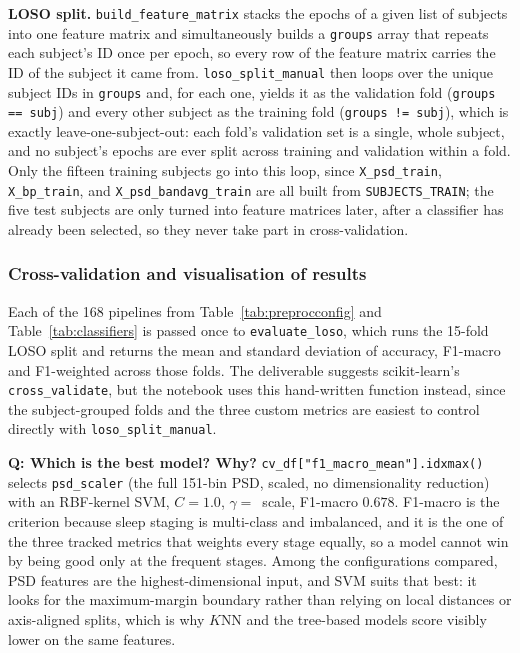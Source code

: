 \documentclass[11pt,a4paper]{article}
\newcommand{\num}[1]{#1}
\begin{document}
\textbf{LOSO split.} \texttt{build\_feature\_matrix} stacks the epochs of a given list of
subjects into one feature matrix and simultaneously builds a \texttt{groups} array that repeats
each subject's ID once per epoch, so every row of the feature matrix carries the ID of the
subject it came from. \texttt{loso\_split\_manual} then loops over the unique subject IDs in
\texttt{groups} and, for each one, yields it as the validation fold (\texttt{groups == subj})
and every other subject as the training fold (\texttt{groups != subj}), which is exactly
leave-one-subject-out: each fold's validation set is a single, whole subject, and no subject's
epochs are ever split across training and validation within a fold. Only the fifteen training
subjects go into this loop, since \texttt{X\_psd\_train}, \texttt{X\_bp\_train}, and
\texttt{X\_psd\_bandavg\_train} are all built from \texttt{SUBJECTS\_TRAIN}; the five test
subjects are only turned into feature matrices later, after a classifier has already been
selected, so they never take part in cross-validation.

\subsubsection{Cross-validation and visualisation of results}

Each of the \num{168} pipelines from Table~\ref{tab:preprocconfig} and Table~\ref{tab:classifiers}
is passed once to \texttt{evaluate\_loso}, which runs the 15-fold LOSO split and returns the mean
and standard deviation of accuracy, F1-macro and F1-weighted across those folds. The deliverable
suggests scikit-learn's \texttt{cross\_validate}, but the notebook uses this hand-written
function instead, since the subject-grouped folds and the three custom metrics are easiest to
control directly with \texttt{loso\_split\_manual}.

\textbf{Q: Which is the best model? Why?} \texttt{cv\_df["f1\_macro\_mean"].idxmax()} selects
\texttt{psd\_scaler} (the full 151-bin PSD, scaled, no dimensionality reduction) with an
RBF-kernel SVM, $C=1.0$, $\gamma=$~scale, F1-macro $0.678$. F1-macro is the criterion because
sleep staging is multi-class and imbalanced, and it is the one of the three tracked metrics that
weights every stage equally, so a model cannot win by being good only at the frequent stages.
Among the configurations compared, PSD features are the highest-dimensional input, and SVM suits
that best: it looks for the maximum-margin boundary rather than relying on local distances or
axis-aligned splits, which is why $K$NN and the tree-based models score visibly lower on the
same features.
\end{document}
